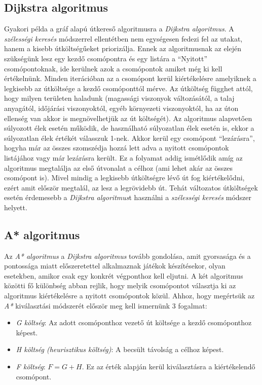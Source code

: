 \subsection{Dijkstra algoritmus}

\noindent Gyakori példa a gráf alapú útkereső algoritmusra a \textit{Dijkstra algoritmus}. A \textit{szélességi keresés} módszerrel ellentétben nem egységesen fedezi fel az utakat, hanem a kisebb útköltségűeket priorizálja. Ennek az algoritmusnak az elején szükségünk lesz egy kezdő csomópontra és egy listára a “Nyitott” csomópontoknak, ide kerülnek azok a csomópontok amiket még ki kell értékelnünk. Minden iterációban az a csomópont kerül kiértékelésre amelyiknek a legkisebb az útköltsége a kezdő csomóponttól mérve. Az útköltség függhet attól, hogy milyen területen haladunk (magassági viszonyok változásától, a talaj anyagától, időjárási viszonyoktól, egyéb környezeti viszonyoktól, ha az úton ellenség van akkor is megnövelhetjük az út költségét). Az algoritmus alapvetően súlyozott élek esetén működik, de használható súlyozatlan élek esetén is, ekkor a súlyozatlan élek értékét válasszuk 1-nek. Akkor kerül egy csomópont “lezárásra”, hogyha már az összes szomszédja hozzá lett adva a nyitott csomópontok listájához vagy már lezárásra került. Ez a folyamat addig ismétlődik amíg az algoritmus megtalálja az első útvonalat a célhoz (ami lehet akár az összes csomópont is). Mivel mindig a legkisebb útköltségre lévő út fog kiértékelődni, ezért amit először megtalál, az lesz a legrövidebb út. Tehát változatos útköltségek esetén érdemesebb a \textit{Dijkstra algoritmus}t használni a \textit{szélességi keresés} módszer helyett.

\subsection{A* algoritmus}

\noindent Az \textit{A* algoritmus} a \textit{Dijkstra algoritmus} tovább gondolása, amit gyorsasága és a pontossága miatt előszeretettel alkalmaznak játékok készítésekor, olyan esetekben, amikor csak egy konkrét végponthoz kell eljutni. A két algoritmus közötti fő különbség abban rejlik, hogy melyik csomópontot választja ki az algoritmus kiértékelésre a nyitott csomópontok közül. Ahhoz, hogy megértsük az \textit{A*} kiválasztási módszerét először meg kell ismernünk 3 fogalmat:

\begin{itemize}
\item \textit{G költség}: Az adott csomóponthoz vezető út költsége a kezdő csomóponthoz képest.
\item \textit{H költség (heurisztikus költség)}: A becsült távolság a célhoz képest.
\item \textit{F költség}: $F = G + H$. Ez az érték alapján kerül kiválasztásra a kiértékelendő csomópont.
\end{itemize}

